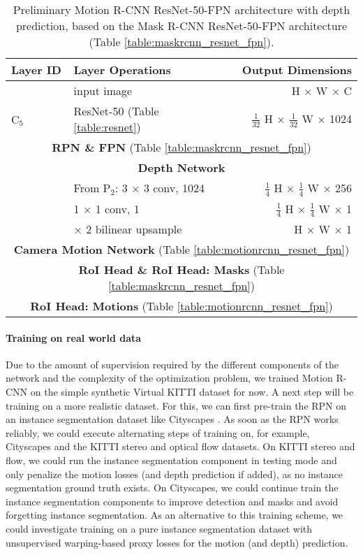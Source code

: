 {
\begin{table}[h]
\centering
\begin{tabular}{llr}
\toprule
\textbf{Layer ID} & \textbf{Layer Operations} & \textbf{Output Dimensions} \\
\midrule\midrule
& input image & H $\times$ W $\times$ C \\
\midrule
C$_5$ & ResNet-50 (Table \ref{table:resnet}) & $\tfrac{1}{32}$ H $\times$ $\tfrac{1}{32}$ W $\times$ 1024 \\
\midrule
\multicolumn{3}{c}{\textbf{RPN \& FPN} (Table \ref{table:maskrcnn_resnet_fpn})} \\
\midrule
\multicolumn{3}{c}{\textbf{Depth Network}}\\
\midrule
& From P$_2$: 3 $\times$ 3 conv, 1024 & $\tfrac{1}{4}$ H $\times$ $\tfrac{1}{4}$ W $\times$ 256 \\
& 1 $\times$ 1 conv, 1 & $\tfrac{1}{4}$ H $\times$ $\tfrac{1}{4}$ W $\times$ 1 \\
& $\times$ 2 bilinear upsample & H $\times$ W $\times$ 1 \\
\midrule
\multicolumn{3}{c}{\textbf{Camera Motion Network} (Table \ref{table:motionrcnn_resnet_fpn})}\\
\midrule
\multicolumn{3}{c}{\textbf{RoI Head \& RoI Head: Masks} (Table \ref{table:maskrcnn_resnet_fpn})} \\
\midrule
\multicolumn{3}{c}{\textbf{RoI Head: Motions} (Table \ref{table:motionrcnn_resnet_fpn})}\\
\bottomrule
\end{tabular}

\caption {
Preliminary Motion R-CNN ResNet-50-FPN architecture with depth prediction,
based on the Mask R-CNN ResNet-50-FPN architecture (Table \ref{table:maskrcnn_resnet_fpn}).
}
\label{table:motionrcnn_resnet_fpn_depth}
\end{table}
}
\paragraph{Training on real world data}
Due to the amount of supervision required by the different components of the network
and the complexity of the optimization problem,
we trained Motion R-CNN on the simple synthetic Virtual KITTI dataset for now.
A next step will be training on a more realistic dataset.
For this, we can first pre-train the RPN on an instance segmentation dataset like
Cityscapes \cite{Cityscapes}. As soon as the RPN works reliably, we could execute alternating
steps of training on, for example, Cityscapes and the KITTI stereo and optical flow datasets.
On KITTI stereo and flow, we could run the instance segmentation component in testing mode and only penalize
the motion losses (and depth prediction if added), as no instance segmentation ground truth exists.
On Cityscapes, we could continue train the instance segmentation components to
improve detection and masks and avoid forgetting instance segmentation.
As an alternative to this training scheme, we could investigate training on a pure
instance segmentation dataset with unsupervised warping-based proxy losses for the motion (and depth) prediction.

